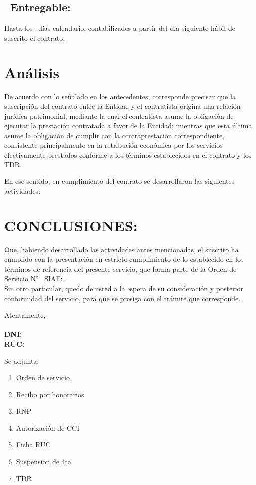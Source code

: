 \documentclass[11pt, a4paper]{article}
\begin{document}
\subsection{\EntregableTexto\ Entregable:}

Hasta los \PlazoEntregable\ días calendario, contabilizados a partir del día siguiente hábil de suscrito el contrato.

\section{Análisis}

De acuerdo con lo señalado en los antecedentes, corresponde precisar que la suscripción del contrato entre la Entidad y el contratista origina una relación jurídica patrimonial, mediante la cual el contratista asume la obligación de ejecutar la prestación contratada a favor de la Entidad; mientras que esta última asume la obligación de cumplir con la contraprestación correspondiente, consistente principalmente en la retribución económica por los servicios efectivamente prestados conforme a los términos establecidos en el contrato y los TDR.

En ese sentido, en cumplimiento del contrato se desarrollaron las siguientes actividades:


\section{CONCLUSIONES:}

Que, habiendo desarrollado las actividades antes mencionadas, el suscrito ha cumplido con la presentación en estricto cumplimiento de lo establecido en los términos de referencia del presente servicio, que forma parte de la Orden de Servicio N° \os\ SIAF: \siaf.\\

Sin otro particular, quedo de usted a la espera de su consideración y posterior conformidad del servicio, para que se prosiga con el trámite que corresponde.\\


\begin{flushleft}
    \FirmaBloque

    Atentamente, \\[0.3em]
    \DeNombre \\
    \textbf{DNI:} \MiDNI \\
    \textbf{RUC:} \MiRUC
\end{flushleft}

\vspace{1.5em}

Se adjunta:

\begin{enumerate}
    \item Orden de servicio
    \item Recibo por honorarios
    \item RNP
    \item Autorización de CCI
    \item Ficha RUC
    \item Suspensión de 4ta
    \item TDR
\end{enumerate}
\end{document}
